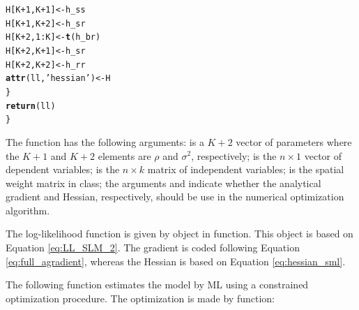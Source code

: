 \documentclass[english,12pt]{book}\usepackage[]{graphicx}\usepackage[]{xcolor}
\makeatletter
\newcommand{\hlnum}[1]{\textcolor[rgb]{0.686,0.059,0.569}{#1}}%
\newcommand{\hlstr}[1]{\textcolor[rgb]{0.192,0.494,0.8}{#1}}%
\newcommand{\hlopt}[1]{\textcolor[rgb]{0,0,0}{#1}}%
\newcommand{\hlstd}[1]{\textcolor[rgb]{0.345,0.345,0.345}{#1}}%
\newcommand{\hlkwb}[1]{\textcolor[rgb]{0.69,0.353,0.396}{#1}}%
\newcommand{\hlkwd}[1]{\textcolor[rgb]{0.737,0.353,0.396}{\textbf{#1}}}%
\newenvironment{kframe}{%
 \def\at@end@of@kframe{}%
 \ifinner\ifhmode%
  \def\at@end@of@kframe{\end{minipage}}%
  \begin{minipage}{\columnwidth}%
 \fi\fi%
 \def\FrameCommand##1{\hskip\@totalleftmargin \hskip-\fboxsep
 \colorbox{shadecolor}{##1}\hskip-\fboxsep
     \hskip-\linewidth \hskip-\@totalleftmargin \hskip\columnwidth}%
 \MakeFramed {\advance\hsize-\width
   \@totalleftmargin\z@ \linewidth\hsize
   \@setminipage}}%
 {\par\unskip\endMakeFramed%
 \at@end@of@kframe}
\newenvironment{knitrout}{}{} %
\makeatother
\begin{document}
\begin{knitrout}
\begin{kframe}
\begin{alltt}
    \hlstd{H[K} \hlopt{+} \hlnum{1}\hlstd{, K} \hlopt{+} \hlnum{1}\hlstd{]} \hlkwb{<-} \hlstd{h_ss}
    \hlstd{H[K} \hlopt{+} \hlnum{1}\hlstd{, K} \hlopt{+} \hlnum{2}\hlstd{]} \hlkwb{<-} \hlstd{h_sr}
    \hlstd{H[K} \hlopt{+} \hlnum{2}\hlstd{,} \hlnum{1}\hlopt{:}\hlstd{K]}   \hlkwb{<-} \hlkwd{t}\hlstd{(h_br)}
    \hlstd{H[K} \hlopt{+} \hlnum{2}\hlstd{, K} \hlopt{+} \hlnum{1}\hlstd{]} \hlkwb{<-} \hlstd{h_sr}
    \hlstd{H[K} \hlopt{+} \hlnum{2}\hlstd{, K} \hlopt{+} \hlnum{2}\hlstd{]} \hlkwb{<-} \hlstd{h_rr}
    \hlkwd{attr}\hlstd{(ll,} \hlstr{'hessian'}\hlstd{)} \hlkwb{<-} \hlstd{H}
  \hlstd{\}}
  \hlkwd{return}\hlstd{(ll)}
\hlstd{\}}
\end{alltt}
\end{kframe}
\end{knitrout}

The function  has the following arguments:  is a $K + 2$ vector of parameters where the $K + 1$ and $K + 2$ elements are $\rho$ and $\sigma^2$, respectively;  is the $n\times 1$ vector of dependent variables;  is the $n\times k$ matrix of independent variables;  is the spatial weight matrix in  class; the arguments  and  indicate whether the analytical gradient and Hessian, respectively, should be use in the numerical optimization algorithm.

The log-likelihood function is given by object  in  function. This object is based on Equation \eqref{eq:LL_SLM_2}. The gradient is coded following Equation \eqref{eq:full_agradient}, whereas the Hessian is based on Equation \eqref{eq:hessian_sml}.

The following function estimates the model by ML using a constrained optimization procedure. The optimization is made by  function:
\end{document}
